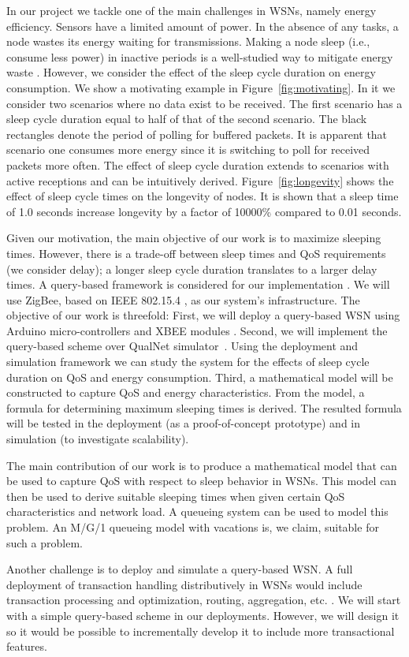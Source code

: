 In our project we tackle one of the main challenges in WSNs, namely energy efficiency. Sensors have a limited amount of power. In the absence of any tasks, a node wastes its energy waiting for transmissions. Making a node sleep (i.e., consume less power) in inactive periods is a well-studied way to mitigate energy waste \cite{1}. However, we consider the effect of the sleep cycle duration on energy consumption. We show a motivating example in Figure~\ref{fig:motivating}. In it we consider two scenarios where no data exist to be received. The first scenario has a sleep cycle duration equal to half of that of the second scenario. The black rectangles denote the period of polling for buffered packets. It is apparent that scenario one consumes more energy since it is switching to poll for received packets more often. The effect of sleep cycle duration extends to scenarios with active receptions and can be intuitively derived.  Figure~\ref{fig:longevity} shows the effect of sleep cycle times on the longevity of nodes. It is shown that a sleep time of 1.0 seconds increase longevity by a factor of 10000\% compared to 0.01 seconds.

Given our motivation, the main objective of our work is to maximize sleeping times. However, there is a trade-off between sleep times and QoS requirements (we consider delay); a longer sleep cycle duration translates to a larger delay times. A query-based framework is considered for our implementation \cite{2}. We will use ZigBee, based on IEEE 802.15.4 \cite{3}, as our system's infrastructure. The objective of our work is threefold: First, we will deploy a query-based WSN using Arduino micro-controllers \cite{17} and XBEE modules \cite{18}. Second, we will implement the query-based scheme over QualNet simulator~\cite{16}. Using the deployment and simulation framework we can study the system for the effects of sleep cycle duration on QoS and energy consumption. Third, a mathematical model will be constructed to capture QoS and energy characteristics. From the model, a formula for determining maximum sleeping times is derived. The resulted formula will be tested in the deployment (as a proof-of-concept prototype) and in simulation (to investigate scalability).

The main contribution of our work is to produce a mathematical model that can be used to capture QoS with respect to sleep behavior in WSNs. This model can then be used to derive suitable sleeping times when given certain QoS characteristics and network load. A queueing system \cite{21} can be used to model this problem. An M/G/1 queueing model with vacations \cite{20} is, we claim, suitable for such a problem.

Another challenge is to deploy and simulate a query-based WSN. A full deployment of transaction handling distributively in WSNs would include transaction processing and optimization, routing, aggregation, etc. \cite{2}. We will start with a simple query-based scheme in our deployments. However, we will design it so it would be possible to incrementally develop it to include more transactional features. 
